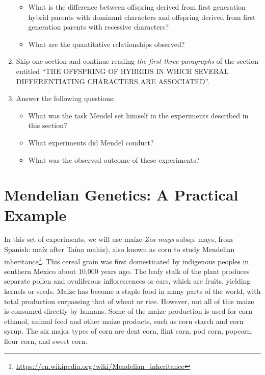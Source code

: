 \documentclass[]{book}
\providecommand{\tightlist}{%
  \setlength{\itemsep}{0pt}\setlength{\parskip}{0pt}}
\let\rmarkdownfootnote\footnote%
\def\footnote{\protect\rmarkdownfootnote}
\renewcommand{\href}[2]{#2\footnote{\url{#1}}}
\begin{document}
\begin{enumerate}
  \begin{itemize}
  \tightlist
  \item
    What is the difference between offspring derived from first generation hybrid parents with dominant characters and offspring derived from first generation parents with recessive characters?
  \item
    What are the quantitative relationships observed?
  \end{itemize}
\item
  Skip one section and continue reading \emph{the first three paragraphs} of the section entitled ``THE OFFSPRING OF HYBRIDS IN WHICH SEVERAL DIFFERENTIATING CHARACTERS ARE ASSOCIATED''.
\item
  Answer the following questions:

  \begin{itemize}
  \tightlist
  \item
    What was the task Mendel set himself in the experiments described in this section?
  \item
    What experiments did Mendel conduct?\\
  \item
    What was the observed outcome of these experiments?
  \end{itemize}
\end{enumerate}

\hypertarget{mendelian-genetics-a-practical-example}{%
\section{Mendelian Genetics: A Practical Example}\label{mendelian-genetics-a-practical-example}}

In this set of experiments, we will use maize \emph{Zea mays} subsp. mays, from Spanish: maíz after Taíno mahiz), also known as corn to study \href{https://en.wikipedia.org/wiki/Mendelian_inheritance}{Mendelian inheritance}. This cereal grain was first domesticated by indigenous peoples in southern Mexico about 10,000 years ago. The leafy stalk of the plant produces separate pollen and ovuliferous inflorescences or ears, which are fruits, yielding kernels or seeds. Maize has become a staple food in many parts of the world, with total production surpassing that of wheat or rice. However, not all of this maize is consumed directly by humans. Some of the maize production is used for corn ethanol, animal feed and other maize products, such as corn starch and corn syrup. The six major types of corn are dent corn, flint corn, pod corn, popcorn, flour corn, and sweet corn.
\end{document}

